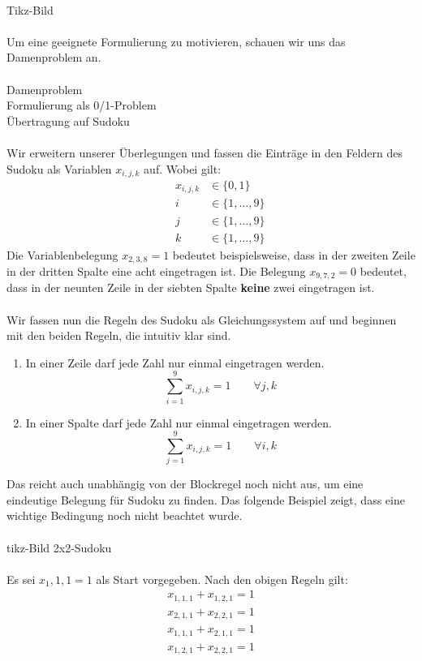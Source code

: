\ \\
Tikz-Bild
\ \\
\ \\
Um eine geeignete Formulierung zu motivieren, schauen wir uns das Damenproblem an.\\
\ \\
Damenproblem\\
Formulierung als 0/1-Problem\\
Übertragung auf Sudoku\\
\ \\
Wir erweitern unserer Überlegungen und fassen die Einträge in den Feldern des Sudoku als Variablen $x_{i,j,k}$ auf. Wobei gilt:
\vspace{-0.5cm}
\begin{align*}
&&x_{i,j,k} & \in \{0,1\} \\
&&i & \in \{1,\dots,9\} \\
&&j & \in \{1,\dots,9\} \\
&&k & \in \{1,\dots,9\}
\end{align*}
Die Variablenbelegung $x_{2,3,8}=1$ bedeutet beispielsweise, dass in der zweiten Zeile in der dritten Spalte eine acht eingetragen ist. Die Belegung $x_{9,7,2}=0$ bedeutet, dass in der neunten Zeile in der siebten Spalte \textbf{keine} zwei eingetragen ist.\\
\ \\
Wir fassen nun die Regeln des Sudoku als Gleichungssystem auf und beginnen mit den beiden Regeln, die intuitiv klar sind.
\begin{enumerate}
\item In einer Zeile darf jede Zahl nur einmal eingetragen werden.
$$ \sum_{i=1}^{9}{x_{i,j,k}}=1 \qquad \forall {j,k}$$ 
\item In einer Spalte darf jede Zahl nur einmal eingetragen werden.
$$ \sum_{j=1}^{9}{x_{i,j,k}}=1 \qquad \forall {i,k}$$ 
\end{enumerate}
Das reicht auch unabhängig von der Blockregel noch nicht aus, um eine eindeutige Belegung für Sudoku zu finden. Das folgende Beispiel zeigt, dass eine wichtige Bedingung noch nicht beachtet wurde.\\
\ \\
tikz-Bild 2x2-Sudoku\\
\ \\
Es sei $x_1,1,1=1$ als Start vorgegeben. Nach den obigen Regeln gilt:
\begin{align}
x_{1,1,1} + x_{1,2,1} = 1\\
x_{2,1,1} + x_{2,2,1} = 1\\
x_{1,1,1} + x_{2,1,1} = 1\\
x_{1,2,1} + x_{2,2,1} = 1
\end{align}
